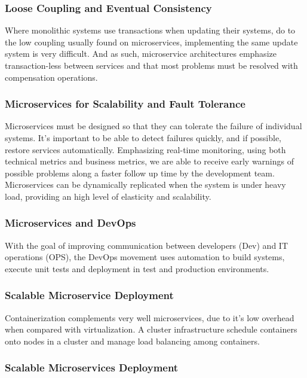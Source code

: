\documentclass[14pt]{extarticle}
\begin{document}
\subsubsection{Loose Coupling and Eventual Consistency}

Where monolithic systems use transactions when updating their systems, do to the low coupling usually found on microservices, implementing the same update system is very difficult. And as such, microservice architectures emphasize transaction-less between services and that most problems must be resolved with compensation operations.

\subsubsection{Microservices for Scalability and Fault Tolerance}

Microservices must be designed so that they can tolerate the failure of individual systems. It's important to be able to detect failures quickly, and if possible, restore services automatically. Emphasizing real-time monitoring, using both technical metrics and business metrics, we are able to receive early warnings of possible problems along a faster follow up time by the development team. Microservices can be dynamically replicated when the system is under heavy load, providing an high level of elasticity and scalability.

\subsubsection{Microservices and DevOps}

With the goal of improving communication between developers (Dev) and IT operations (OPS), the DevOps movement uses automation to build systems, execute unit tests and deployment in test and production environments.

\subsubsection{Scalable Microservice Deployment}

Containerization complements very well microservices, due to it's low overhead when compared with virtualization. A cluster infrastructure schedule containers onto nodes in a cluster and manage load balancing among containers.

\subsubsection{Scalable Microservices Deployment}
\end{document}
